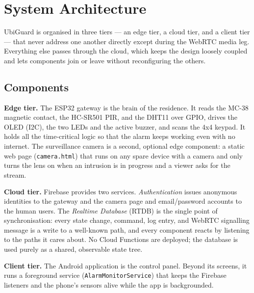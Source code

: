 \documentclass[10pt,twocolumn]{article}
\begin{document}
\section{System Architecture}
UbiGuard is organised in three tiers --- an edge tier, a cloud tier, and a client tier --- that never address one another directly except during the WebRTC media leg. Everything else passes through the cloud, which keeps the design loosely coupled and lets components join or leave without reconfiguring the others.

\subsection{Components}
\textbf{Edge tier.} The ESP32 gateway is the brain of the residence. It reads the MC-38 magnetic contact, the HC-SR501 PIR, and the DHT11 over GPIO, drives the OLED (I2C), the two LEDs and the active buzzer, and scans the 4x4 keypad. It holds all the time-critical logic so that the alarm keeps working even with no internet. The surveillance camera is a second, optional edge component: a static web page (\texttt{camera.html}) that runs on any spare device with a camera and only turns the lens on when an intrusion is in progress and a viewer asks for the stream.

\textbf{Cloud tier.} Firebase provides two services. \emph{Authentication} issues anonymous identities to the gateway and the camera page and email/password accounts to the human users. The \emph{Realtime Database} (RTDB) is the single point of synchronisation: every state change, command, log entry, and WebRTC signalling message is a write to a well-known path, and every component reacts by listening to the paths it cares about. No Cloud Functions are deployed; the database is used purely as a shared, observable state tree.

\textbf{Client tier.} The Android application is the control panel. Beyond its screens, it runs a foreground service (\texttt{AlarmMonitorService}) that keeps the Firebase listeners and the phone's sensors alive while the app is backgrounded.
\end{document}
